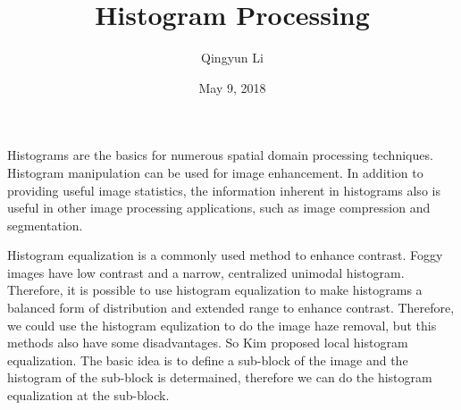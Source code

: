 \documentclass{article}
\author{Qingyun Li}
\date{May 9, 2018}
\title{Histogram Processing}
\begin{document}
\maketitle
 \par Histograms are the basics for numerous spatial domain processing techniques. Histogram manipulation can be used for image enhancement. In addition to providing useful image statistics, the information inherent in histograms also is useful in other image processing applications, such as image compression and segmentation. 
 \par Histogram equalization is a commonly used method to enhance contrast. Foggy images have low contrast and a narrow, centralized unimodal histogram. Therefore, it is possible to use histogram equalization to make histograms a balanced form of distribution and extended range to enhance contrast. Therefore, we could use the histogram equlization to do the image haze removal, but this methods also have some disadvantages. So Kim\cite{Kim2001An} proposed local histogram equalization. The basic idea is to define a sub-block of the image and the histogram of the sub-block is determained, therefore we can do the histogram equalization at the sub-block. 


\end{document}
